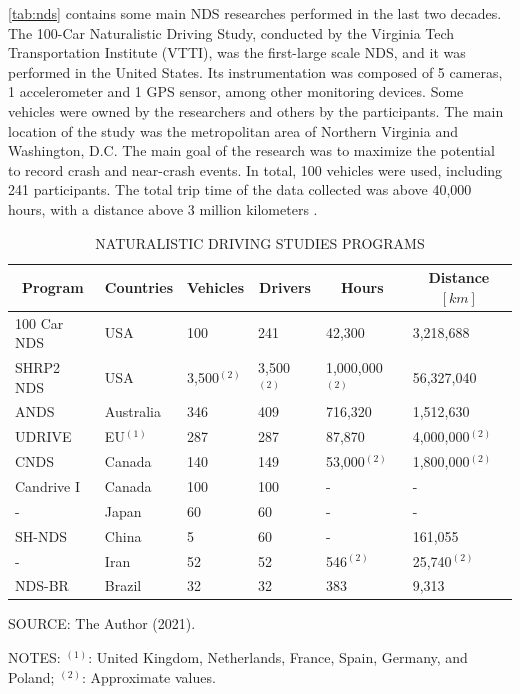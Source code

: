 \autoref{tab:nds} contains some main NDS researches performed in the last two decades. The 100-Car Naturalistic Driving Study, conducted by the Virginia Tech Transportation Institute (VTTI), was the first-large scale NDS, and it was performed in the United States. Its instrumentation was composed of 5 cameras, 1 accelerometer and 1 GPS sensor, among other monitoring devices. Some vehicles were owned by the researchers and others by the participants. The main location of the study was the metropolitan area of Northern Virginia and Washington, D.C. The main goal of the research was to maximize the potential to record crash and near-crash events. In total, 100 vehicles were used, including 241 participants. The total trip time of the data collected was above 40,000 hours, with a distance above 3 million kilometers \cite{Neale2005}.

\begin{table}[!hbtp]
    \footnotesize
    \captionsetup{justification=raggedright,
        singlelinecheck=false,
        font=footnotesize}
    \caption{NATURALISTIC DRIVING STUDIES PROGRAMS}
    \centering
    \begin{tabular}{llllll}
        \hline
        \multicolumn{1}{c}{\textbf{Program}} & \multicolumn{1}{c}{\textbf{Countries}} & \multicolumn{1}{c}{\textbf{Vehicles}} & \multicolumn{1}{c}{\textbf{Drivers}} & \multicolumn{1}{c}{\textbf{Hours}} & \multicolumn{1}{c}{\textbf{Distance} $[km]$} \\
        \hline
        100 Car NDS & USA        & 100 & 241 & 42,300 & 3,218,688 \\
        SHRP2 NDS   & USA        & 3,500$^{(2)}$ & 3,500$^{(2)}$ & 1,000,000$^{(2)}$ & 56,327,040 \\
        ANDS        & Australia  & 346 & 409 & 716,320 & 1,512,630 \\
        UDRIVE      & EU$^{(1)}$ & 287 & 287 & 87,870 & 4,000,000$^{(2)}$ \\
        CNDS        & Canada     & 140 & 149 & 53,000$^{(2)}$ & 1,800,000$^{(2)}$ \\
        Candrive I  & Canada     & 100 & 100 & - & - \\
        -           & Japan      & 60  & 60  & - & - \\
        SH-NDS      & China      & 5   & 60  & - & 161,055 \\
        -           & Iran       & 52  & 52  & 546$^{(2)}$ & 25,740$^{(2)}$ \\
        NDS-BR      & Brazil     & 32  & 32  & 383 & 9,313 \\ 
        \hline
    \end{tabular}
    \label{tab:nds}
    \par \vspace{2mm} \footnotesize \raggedright
    SOURCE: The Author (2021).
    \par \vspace{1mm} \footnotesize \raggedright
    NOTES: $^{(1)}$: United Kingdom, Netherlands, France, Spain, Germany, and Poland; $^{(2)}$: Approximate values.
\end{table}

